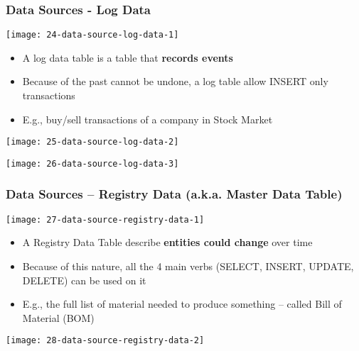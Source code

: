 \subsubsection{Data Sources - Log Data}

\begin{center}
\texttt{[image: 24-data-source-log-data-1]}
\end{center}

\begin{itemize}
	\item A log data table is a table that \textbf{records events}
	\item Because of the past cannot be undone, a log table allow INSERT only transactions
	\item E.g., buy/sell transactions of a company in Stock Market
\end{itemize}

\begin{center}
\texttt{[image: 25-data-source-log-data-2]}
\end{center}

\hrulefill

\begin{center}
\texttt{[image: 26-data-source-log-data-3]}
\end{center}

\subsubsection{Data Sources – Registry Data (a.k.a. Master Data Table)}

\begin{center}
\texttt{[image: 27-data-source-registry-data-1]}
\end{center}

\begin{itemize}
	\item A Registry Data Table describe \textbf{entities could change} over
time
	\item Because of this nature, all the 4 main verbs (SELECT,
INSERT, UPDATE, DELETE) can be used on it
	\item E.g., the full list of material needed to produce something
– called Bill of Material (BOM)
\end{itemize}

\begin{center}
\texttt{[image: 28-data-source-registry-data-2]}
\end{center}

